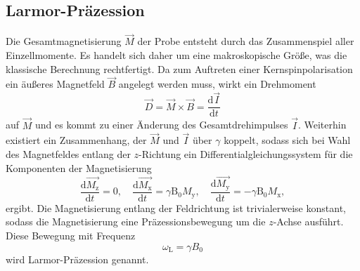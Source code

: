 \subsection{Larmor-Präzession}
Die Gesamtmagnetisierung $\vec{M}$ der Probe entsteht durch das Zusammenspiel aller
Einzellmomente. Es handelt sich daher um eine makroskopische Größe, was die klassische
Berechnung rechtfertigt.
Da zum Auftreten einer Kernspinpolarisation ein äußeres Magnetfeld $\vec{B}$ angelegt werden muss,
wirkt ein Drehmoment
\begin{equation}
		\vec{D} = \vec{M} \times \vec{B} = \frac{\text{d} \vec{I}}{\text{d}t}
\end{equation}
auf $\vec{M}$ und es kommt zu einer Änderung des Gesamtdrehimpulses $\vec{I}$.
Weiterhin existiert ein Zusammenhang, der $\vec{M}$ und $\vec{I}$ über $\gamma$
koppelt, sodass sich bei Wahl des Magnetfeldes entlang der $z$-Richtung ein Differentialgleichungssystem
für die Komponenten der Magnetisierung
\begin{equation}
		\frac{\text{d} \vec{M_\text{z}}}{\text{d}t} = 0 ,  \hspace{1em}
		\frac{\text{d} \vec{M_\text{x}}}{\text{d}t} = \gamma \text{B}_0
		M_\text{y}, \hspace{1em}
		\frac{\text{d} \vec{M_\text{y}}}{\text{d}t} = - \gamma \text{B}_0
		M_\text{x},
\end{equation}
ergibt.
Die Magnetisierung entlang der Feldrichtung ist trivialerweise konstant, sodass
die Magnetisierung eine Präzessionsbewegung um die $z$-Achse
ausführt.
Diese Bewegung mit Frequenz
\begin{equation}
  \omega_{\text{L}} = \gamma B_{0}
\end{equation}
wird Larmor-Präzession genannt.


